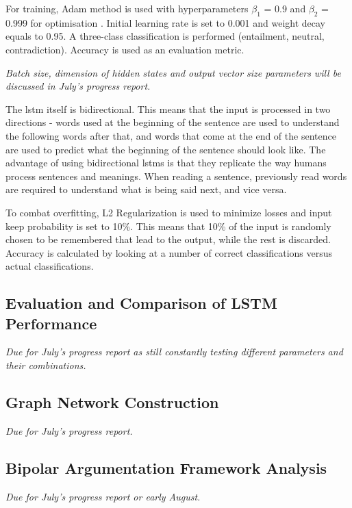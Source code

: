         For training, Adam method is used with hyperparameters $\beta_1$ = 0.9 and $\beta_2$ = 0.999 for optimisation \autocite{Kingma2015AdamAM}. Initial learning rate is set to 0.001 and weight decay equals to 0.95. A three-class classification is performed (entailment, neutral, contradiction). Accuracy is used as an evaluation metric.
        
        \textit{Batch size, dimension of hidden states and output vector size parameters will be discussed in July's progress report.}
        
        The \gls{lstm} itself is bidirectional. This means that the input is processed in two directions - words used at the beginning of the sentence are used to understand the following words after that, and words that come at the end of the sentence are used to predict what the beginning of the sentence should look like. The advantage of using bidirectional \gls{lstm}s is that they replicate the way humans process sentences and meanings. When reading a sentence, previously read words are required to understand what is being said next, and vice versa.
        
        To combat overfitting, L2 Regularization is used to minimize losses and input keep probability is set to 10\%. This means that 10\% of the input is randomly chosen to be remembered that lead to the output, while the rest is discarded. Accuracy is calculated by looking at a number of correct classifications versus actual classifications.
        
    \subsection{Evaluation and Comparison of LSTM Performance} \label{evalstm}
        \textit{Due for July's progress report as still constantly testing different parameters and their combinations.}
    
    \subsection{Graph Network Construction} \label{graphnetwork}
        \textit{Due for July's progress report.}
    
    \subsection{Bipolar Argumentation Framework Analysis} \label{bapanalysis}
        \textit{Due for July's progress report or early August.}
    
